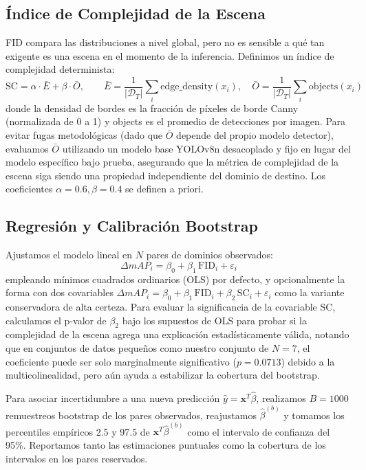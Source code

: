 \documentclass[10pt,twocolumn,letterpaper]{article}
\begin{document}
\subsection{Índice de Complejidad de la Escena}
FID compara las distribuciones a nivel global, pero no es sensible a qué tan exigente es una escena en el momento de la inferencia. Definimos un índice de complejidad determinista:
\begin{equation}
    \text{SC} = \alpha \cdot \bar{E} + \beta \cdot \bar{O}, \qquad
    \bar{E} = \frac{1}{|\mathcal{D}_T|}\sum_{i} \text{edge\_density}(x_i), \quad
    \bar{O} = \frac{1}{|\mathcal{D}_T|}\sum_{i} \text{objects}(x_i)
\end{equation}
donde la densidad de bordes es la fracción de píxeles de borde Canny (normalizada de 0 a 1) y objects es el promedio de detecciones por imagen. Para evitar fugas metodológicas (dado que $\bar{O}$ depende del propio modelo detector), evaluamos $\bar{O}$ utilizando un modelo base YOLOv8n desacoplado y fijo en lugar del modelo específico bajo prueba, asegurando que la métrica de complejidad de la escena siga siendo una propiedad independiente del dominio de destino. Los coeficientes $\alpha=0.6, \beta=0.4$ se definen a priori.

\subsection{Regresión y Calibración Bootstrap}
Ajustamos el modelo lineal en $N$ pares de dominios observados:
\begin{equation}
    \Delta mAP_i = \beta_0 + \beta_1\,\text{FID}_i + \varepsilon_i
\end{equation}
empleando mínimos cuadrados ordinarios (OLS) por defecto, y opcionalmente la forma con dos covariables $\Delta mAP_i = \beta_0 + \beta_1\,\text{FID}_i + \beta_2\,\text{SC}_i + \varepsilon_i$ como la variante conservadora de alta certeza. Para evaluar la significancia de la covariable SC, calculamos el p-valor de $\beta_2$ bajo los supuestos de OLS para probar si la complejidad de la escena agrega una explicación estadísticamente válida, notando que en conjuntos de datos pequeños como nuestro conjunto de $N=7$, el coeficiente puede ser solo marginalmente significativo ($p=0.0713$) debido a la multicolinealidad, pero aún ayuda a estabilizar la cobertura del bootstrap.

Para asociar incertidumbre a una nueva predicción $\hat{y} = \mathbf{x}^T \hat{\beta}$, realizamos $B = 1000$ remuestreos bootstrap de los pares observados, reajustamos $\hat{\beta}^{(b)}$ y tomamos los percentiles empíricos 2.5 y 97.5 de $\mathbf{x}^T \hat{\beta}^{(b)}$ como el intervalo de confianza del 95\%. Reportamos tanto las estimaciones puntuales como la cobertura de los intervalos en los pares reservados.
\end{document}

